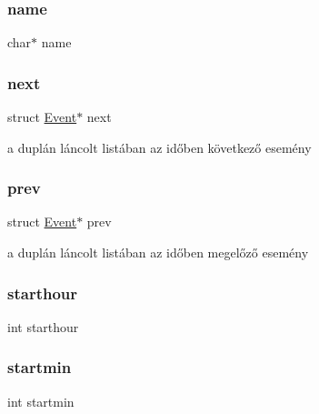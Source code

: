 \mbox{\label{struct_event_a5ac083a645d964373f022d03df4849c8}} 
\subsubsection{\texorpdfstring{name}{name}}
{\footnotesize\ttfamily char$\ast$ name}

\mbox{\label{struct_event_a306f86f79bc8a24df2ff2989f10ea5b8}} 
\subsubsection{\texorpdfstring{next}{next}}
{\footnotesize\ttfamily struct \hyperlink{struct_event}{Event}$\ast$ next}

a duplán láncolt listában az időben következő esemény \mbox{\label{struct_event_a587efee11d7ca5779c56b343342c65f9}} 
\subsubsection{\texorpdfstring{prev}{prev}}
{\footnotesize\ttfamily struct \hyperlink{struct_event}{Event}$\ast$ prev}

a duplán láncolt listában az időben megelőző esemény \mbox{\label{struct_event_ad40616cbc61c79a6caf6c8c2464bab8d}} 
\subsubsection{\texorpdfstring{starthour}{starthour}}
{\footnotesize\ttfamily int starthour}

\mbox{\label{struct_event_a6a7bf86ae11349bf260da9abce25452a}} 
\subsubsection{\texorpdfstring{startmin}{startmin}}
{\footnotesize\ttfamily int startmin}

